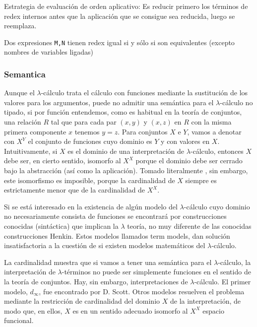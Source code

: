 Estrategia de evaluación de orden aplicativo:
Es reducir primero los términos de redex internos antes que la aplicación que se consigue sea reducida, luego se reemplaza.

\begin{thm}
Dos expresiones \texttt{M,N} tienen redex igual si y sólo si son equivalentes (excepto nombres de variables ligadas)
\end{thm}

\subsubsection{Semantica}

Aunque el $\lambda$-cálculo trata el cálculo con funciones mediante la sustitución de los valores para los argumentos, puede no admitir una semántica para el $\lambda$-cálculo no tipado, si por función entendemos, como es habitual en la teoría de conjuntos, una relación $R$ tal que para cada par $(x, y)$ y $(x, z)$ en $R$ con la misma primera componente $x$ tenemos $y = z$. Para conjuntos $X$ e $Y$, vamos a denotar con $X^Y$ el conjunto de funciones cuyo dominio es $Y$ y con valores en $X$. Intuitivamente, si $X$ es el dominio de una interpretación de 
$\lambda$-cálculo, entonces $X$ debe ser, en cierto sentido, isomorfo al $X^X$ porque el dominio debe ser cerrado bajo la abstracción (así como la aplicación). Tomado literalmente \cite{Lambda2013}, sin embargo, este isomorfismo es imposible, porque la cardinalidad de $X$ siempre es estrictamente menor que de la cardinalidad de $X^X$.

Si se está interesado en la existencia de algún modelo del 
$\lambda$-cálculo cuyo dominio no necesariamente consista de funciones se encontrará por construcciones conocidas (sintáctica) que implican la $\lambda$ teoría, no muy diferente de las conocidas construcciones Henkin. Estos modelos llamados term models, dan solución insatisfactoria a la cuestión de si existen modelos matemáticos del $\lambda$-cálculo.

La cardinalidad muestra que si vamos a tener una semántica para el 
$\lambda$-cálculo, la interpretación de $\lambda$-términos no puede ser simplemente funciones en el sentido de la teoría de conjuntos. 
Hay, sin embargo, interpretaciones de $\lambda$-cálculo. 
El primer modelo, $d_{\infty}$, fue encontrado por D. Scott. Otros modelos resuelven el problema mediante la restricción de cardinalidad del dominio $X$ de la interpretación, de modo que, en ellos, $X$ es en un sentido adecuado isomorfo al $X^X$ espacio funcional.

